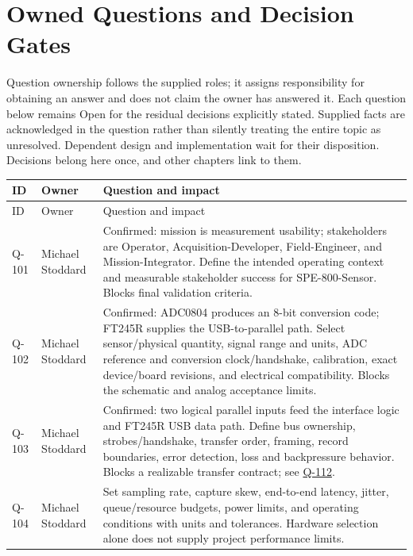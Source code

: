 \section{Owned Questions and Decision Gates}
\label{Section:OwnedQuestions}
Question ownership follows the supplied roles; it assigns responsibility for obtaining an answer and does not claim the owner has answered it. Each question below remains Open for the residual decisions explicitly stated. Supplied facts are acknowledged in the question rather than silently treating the entire topic as unresolved. Dependent design and implementation wait for their disposition. Decisions belong here once, and other chapters link to them.
\small
\begin{tabularx}{\linewidth}{L{1.3cm}L{3.1cm}Y}
\caption{Owned Questions\label{Table:OwnedQuestions}}\\
\toprule
ID & Owner & Question and impact\\\midrule
\endfirsthead
\toprule
ID & Owner & Question and impact\\\midrule
\endhead
\bottomrule
\endlastfoot
{}\label{Question:Q-101}Q-101 & Michael Stoddard & Confirmed: mission is measurement usability; stakeholders are Operator, Acquisition-Developer, Field-Engineer, and Mission-Integrator. Define the intended operating context and measurable stakeholder success for SPE-800-Sensor. Blocks final validation criteria.\\
\label{Question:Q-102}Q-102 & Michael Stoddard & Confirmed: ADC0804 produces an 8-bit conversion code; FT245R supplies the USB-to-parallel path. Select sensor/physical quantity, signal range and units, ADC reference and conversion clock/handshake, calibration, exact device/board revisions, and electrical compatibility. Blocks the schematic and analog acceptance limits.\\
\label{Question:Q-103}Q-103 & Michael Stoddard & Confirmed: two logical parallel inputs feed the interface logic and FT245R USB data path. Define bus ownership, strobes/handshake, transfer order, framing, record boundaries, error detection, loss and backpressure behavior. Blocks a realizable transfer contract; see \hyperref[Question:Q-112]{Q-112}.\\
\label{Question:Q-104}Q-104 & Michael Stoddard & Set sampling rate, capture skew, end-to-end latency, jitter, queue/resource budgets, power limits, and operating conditions with units and tolerances. Hardware selection alone does not supply project performance limits.\\

\end{tabularx}
